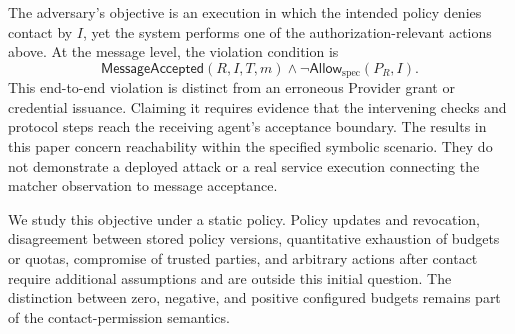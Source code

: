 The adversary's objective is an execution in which the intended policy denies
contact by $I$, yet the system performs one of the authorization-relevant
actions above. At the message level, the violation condition is
\[
  \mathsf{MessageAccepted}(R,I,T,m)
  \land \neg\mathsf{Allow}_{\mathrm{spec}}(P_R,I).
\]
This end-to-end violation is distinct from an erroneous Provider grant or
credential issuance. Claiming it requires evidence that the intervening
checks and protocol steps reach the receiving agent's acceptance boundary.
The results in this paper concern reachability within the specified symbolic
scenario. They do not demonstrate a deployed attack or a real service execution
connecting the matcher observation to message acceptance.

We study this objective under a static policy. Policy updates and revocation,
disagreement between stored policy versions, quantitative exhaustion of
budgets or quotas, compromise of trusted parties, and arbitrary actions after
contact require additional assumptions and are outside this initial question.
The distinction between zero, negative, and positive configured budgets
remains part of the contact-permission semantics.
